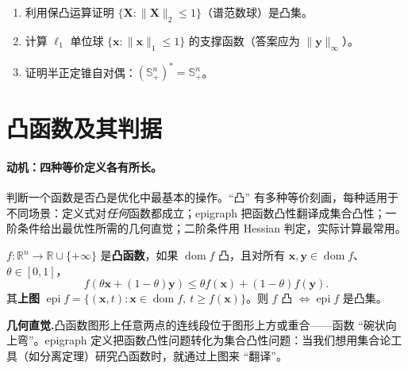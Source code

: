 \begin{practice}
\begin{enumerate}
  \item 利用保凸运算证明 $\{\mathbf X:\|\mathbf X\|_2\le1\}$（谱范数球）是凸集。
  \item 计算 $\ell_1$ 单位球 $\{\mathbf x:\|\mathbf x\|_1\le1\}$ 的支撑函数（答案应为 $\|\mathbf y\|_\infty$）。
  \item 证明半正定锥自对偶：$(\mathbb{S}^n_+)^\ast=\mathbb{S}^n_+$。
\end{enumerate}
\end{practice}

\section{凸函数及其判据}
\label{sec:cvx-fun}

\paragraph{动机：四种等价定义各有所长。}
判断一个函数是否凸是优化中最基本的操作。“凸” 有多种等价刻画，每种适用于不同场景：定义式对\emph{任何}函数都成立；epigraph 把函数凸性翻译成集合凸性；一阶条件给出最优性所需的几何直觉；二阶条件用 Hessian 判定，实际计算最常用。

\begin{definition}[凸函数及其上图]\label{def:convex-fun}
$f:\mathbb{R}^n\to\mathbb{R}\cup\{+\infty\}$ 是\textbf{凸函数}，如果 $\operatorname{dom}f$ 凸，且对所有 $\mathbf x,\mathbf y\in\operatorname{dom}f$、$\theta\in[0,1]$，
\begin{equation}
  f(\theta\mathbf x+(1-\theta)\mathbf y)\le\theta f(\mathbf x)+(1-\theta)f(\mathbf y).
  \label{eq:convex-fun-def}
\end{equation}
其\textbf{上图} $\operatorname{epi}f=\{(\mathbf x,t):\mathbf x\in\operatorname{dom}f,\ t\ge f(\mathbf x)\}$。则 $f$ 凸 $\iff\operatorname{epi}f$ 是凸集。
\end{definition}

\noindent\textbf{几何直觉.}\;凸函数图形上任意两点的连线段位于图形上方或重合——函数 “碗状向上弯”。epigraph 定义把函数凸性问题转化为集合凸性问题：当我们想用集合论工具（如分离定理）研究凸函数时，就通过上图来 “翻译”。

